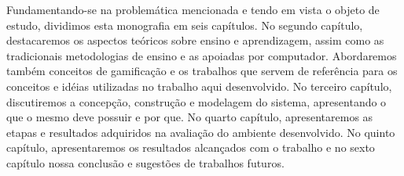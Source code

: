 Fundamentando-se na problemática mencionada e tendo em vista o objeto de estudo, dividimos esta monografia em seis capítulos. 
No segundo cap\'itulo, destacaremos os aspectos teóricos sobre ensino e aprendizagem, assim como as tradicionais metodologias de ensino e as apoiadas por computador. Abordaremos tamb\'em conceitos de gamificação e os trabalhos que servem de refer\^encia para os conceitos e id\'eias utilizadas no trabalho aqui desenvolvido. 
No terceiro capítulo, discutiremos a concepção, construção e modelagem do sistema, apresentando o que o mesmo deve possuir e por que. No quarto capítulo, apresentaremos as etapas e resultados adquiridos na avaliação do ambiente desenvolvido. No quinto capítulo, apresentaremos os resultados alcan\c{c}ados com o trabalho e no sexto capítulo nossa conclusão e sugestões de trabalhos futuros. 